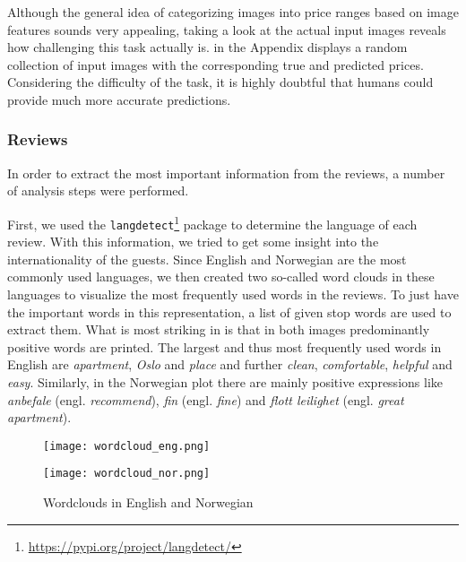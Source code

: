 Although the general idea of categorizing images into price ranges based on image features sounds very appealing, taking a look at the actual input images reveals how challenging this task actually is.
 in the Appendix displays a random collection of input images with the corresponding true and predicted prices.
Considering the difficulty of the task, it is highly doubtful that humans could provide much more accurate predictions.


\subsubsection{Reviews}

In order to extract the most important information from the reviews, a number of analysis steps were performed.

First, we used the \texttt{langdetect}\footnote{\url{https://pypi.org/project/langdetect/}} package to determine the language of each review.
With this information, we tried to get some insight into the internationality of the guests.
Since English and Norwegian are the most commonly used languages, we then created two so-called word clouds in these languages to visualize the most frequently used words in the reviews.
To just have the important words in this representation, a list of given stop words are used to extract them.
What is most striking in  is that in both images predominantly positive words are printed.
The largest and thus most frequently used words in English are \textit{apartment}, \textit{Oslo} and \textit{place} and further \textit{clean}, \textit{comfortable}, \textit{helpful} and \textit{easy}.
Similarly, in the Norwegian plot there are mainly positive expressions like \textit{anbefale} (engl. \emph{recommend}), \textit{fin} (engl. \emph{fine}) and \textit{flott leilighet} (engl. \emph{great apartment}).

\begin{figure}[t]
  \centering
  \begin{minipage}{6.7cm}
    \texttt{[image: wordcloud\_eng.png]}
  \end{minipage}
  \begin{minipage}{6.7cm}
    \texttt{[image: wordcloud\_nor.png]}
  \end{minipage}
  \caption{Wordclouds in English and Norwegian}
  \label{fig:wordclouds}
\end{figure}

